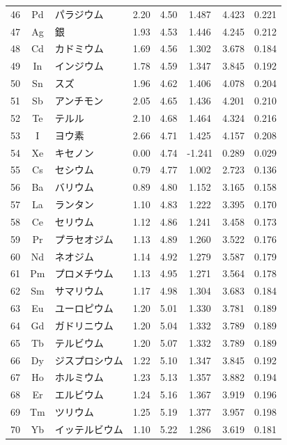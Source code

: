 \documentclass[11pt,a4paper]{article}
\begin{document}
\begin{longtable}{|c|c|p{2.5cm}|c|c|c|c|c|}
			46 & Pd & パラジウム & 2.20 & 4.50 & 1.487 & 4.423 & 0.221 \\
			47 & Ag & 銀 & 1.93 & 4.53 & 1.446 & 4.245 & 0.212 \\
			48 & Cd & カドミウム & 1.69 & 4.56 & 1.302 & 3.678 & 0.184 \\
			49 & In & インジウム & 1.78 & 4.59 & 1.347 & 3.845 & 0.192 \\
			50 & Sn & スズ & 1.96 & 4.62 & 1.406 & 4.078 & 0.204 \\
			51 & Sb & アンチモン & 2.05 & 4.65 & 1.436 & 4.201 & 0.210 \\
			52 & Te & テルル & 2.10 & 4.68 & 1.464 & 4.324 & 0.216 \\
			53 & I & ヨウ素 & 2.66 & 4.71 & 1.425 & 4.157 & 0.208 \\
			54 & Xe & キセノン & 0.00 & 4.74 & -1.241 & 0.289 & 0.029 \\
			55 & Cs & セシウム & 0.79 & 4.77 & 1.002 & 2.723 & 0.136 \\
			56 & Ba & バリウム & 0.89 & 4.80 & 1.152 & 3.165 & 0.158 \\
			57 & La & ランタン & 1.10 & 4.83 & 1.222 & 3.395 & 0.170 \\
			58 & Ce & セリウム & 1.12 & 4.86 & 1.241 & 3.458 & 0.173 \\
			59 & Pr & プラセオジム & 1.13 & 4.89 & 1.260 & 3.522 & 0.176 \\
			60 & Nd & ネオジム & 1.14 & 4.92 & 1.279 & 3.587 & 0.179 \\
			61 & Pm & プロメチウム & 1.13 & 4.95 & 1.271 & 3.564 & 0.178 \\
			62 & Sm & サマリウム & 1.17 & 4.98 & 1.304 & 3.683 & 0.184 \\
			63 & Eu & ユーロピウム & 1.20 & 5.01 & 1.330 & 3.781 & 0.189 \\
			64 & Gd & ガドリニウム & 1.20 & 5.04 & 1.332 & 3.789 & 0.189 \\
			65 & Tb & テルビウム & 1.20 & 5.07 & 1.332 & 3.789 & 0.189 \\
			66 & Dy & ジスプロシウム & 1.22 & 5.10 & 1.347 & 3.845 & 0.192 \\
			67 & Ho & ホルミウム & 1.23 & 5.13 & 1.357 & 3.882 & 0.194 \\
			68 & Er & エルビウム & 1.24 & 5.16 & 1.367 & 3.919 & 0.196 \\
			69 & Tm & ツリウム & 1.25 & 5.19 & 1.377 & 3.957 & 0.198 \\
			70 & Yb & イッテルビウム & 1.10 & 5.22 & 1.286 & 3.619 & 0.181 \\

\end{longtable}
\end{document}
